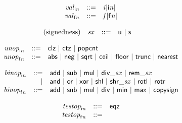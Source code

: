 \vspace{1ex}

$$
\begin{array}{@{}lrrl@{}l@{}}
& {{\mathit{val}}}_{{\mathsf{i}}{{\mathit{n}}}} &::=& {{\mathit{i}}}{{|{\mathsf{i}}{{\mathit{n}}}|}} \\
& {{\mathit{val}}}_{{\mathsf{f}}{{\mathit{n}}}} &::=& {{\mathit{f}}}{{|{\mathsf{f}}{{\mathit{n}}}|}} \\
\end{array}
$$

\vspace{1ex}

$$
\begin{array}{@{}lrrl@{}l@{}}
\mbox{(signedness)} & {\mathit{sx}} &::=& \mathsf{u} ~|~ \mathsf{s} \\
\end{array}
$$

$$
\begin{array}{@{}lrrl@{}l@{}}
& {{\mathit{unop}}}_{{\mathsf{i}}{{\mathit{n}}}} &::=& \mathsf{clz} ~|~ \mathsf{ctz} ~|~ \mathsf{popcnt} \\
& {{\mathit{unop}}}_{{\mathsf{f}}{{\mathit{n}}}} &::=& \mathsf{abs} ~|~ \mathsf{neg} ~|~ \mathsf{sqrt} ~|~ \mathsf{ceil} ~|~ \mathsf{floor} ~|~ \mathsf{trunc} ~|~ \mathsf{nearest} \\
\end{array}
$$

$$
\begin{array}{@{}lrrl@{}l@{}}
& {{\mathit{binop}}}_{{\mathsf{i}}{{\mathit{n}}}} &::=& \mathsf{add} ~|~ \mathsf{sub} ~|~ \mathsf{mul} ~|~ {\mathsf{div\_}}{{\mathit{sx}}} ~|~ {\mathsf{rem\_}}{{\mathit{sx}}} \\ &&|&
\mathsf{and} ~|~ \mathsf{or} ~|~ \mathsf{xor} ~|~ \mathsf{shl} ~|~ {\mathsf{shr\_}}{{\mathit{sx}}} ~|~ \mathsf{rotl} ~|~ \mathsf{rotr} \\
& {{\mathit{binop}}}_{{\mathsf{f}}{{\mathit{n}}}} &::=& \mathsf{add} ~|~ \mathsf{sub} ~|~ \mathsf{mul} ~|~ \mathsf{div} ~|~ \mathsf{min} ~|~ \mathsf{max} ~|~ \mathsf{copysign} \\
\end{array}
$$

$$
\begin{array}{@{}lrrl@{}l@{}}
& {{\mathit{testop}}}_{{\mathsf{i}}{{\mathit{n}}}} &::=& \mathsf{eqz} \\
& {{\mathit{testop}}}_{{\mathsf{f}}{{\mathit{n}}}} &::=&  \\
\end{array}
$$

